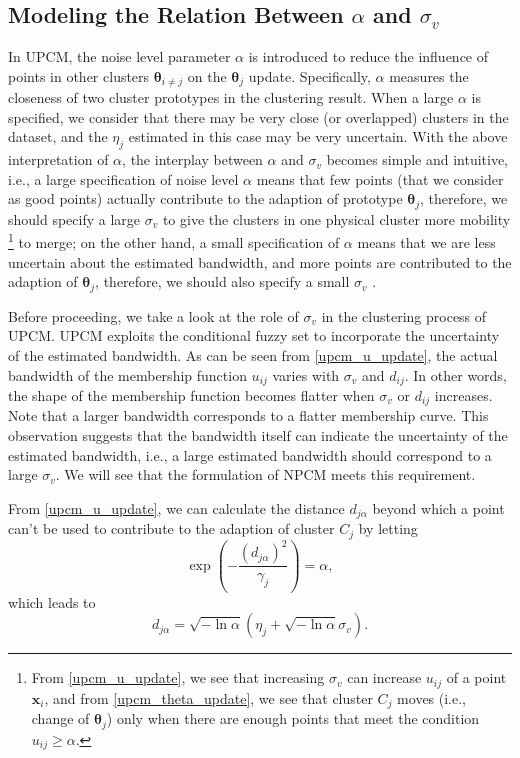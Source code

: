 \documentclass[conference]{IEEEtran}
\theoremstyle{definition}
\begin{document}
\subsection{Modeling the Relation Between $\alpha$ and $\sigma_v$}
\label{sec-3-3}
In UPCM, the noise level parameter $\alpha$ is introduced to reduce the influence of points in other clusters $\boldsymbol{\theta}_{i\neq j}$ on the $\boldsymbol{\theta}_j$ update. Specifically, $\alpha$ measures the closeness of two cluster prototypes in the clustering result. When a large $\alpha$ is specified, we consider that there may be very close (or overlapped) clusters in the dataset, and the $\eta_j$ estimated in this case may be very uncertain. With the above interpretation of $\alpha$, the interplay between $\alpha$ and $\sigma_v$ becomes simple and intuitive, i.e., a large specification of noise level $\alpha$ means that few points (that we consider as good points) actually contribute to the adaption of prototype $\boldsymbol{\theta}_j$, therefore, we should specify a large $\sigma_v$ to give the clusters in one physical cluster more mobility
\footnote{From \eqref{upcm_u_update}, we see that increasing $\sigma_v$ can increase $u_{ij}$ of a point $\mathbf{x}_i$, and from \eqref{upcm_theta_update}, we see that cluster $C_j$ moves (i.e., change of $\boldsymbol{\theta}_j$) only when there are enough points that meet the condition $u_{ij}\geq \alpha$.}
to merge; on the other hand, a small specification of $\alpha$ means that we are less uncertain about the estimated bandwidth, and more points are contributed to the adaption of $\boldsymbol{\theta}_j$, therefore, we should also specify a small $\sigma_v$ \cite{hou_pcm_2016}.

Before proceeding, we take a look at the role of $\sigma_v$ in the clustering process of UPCM. UPCM exploits the conditional fuzzy set to incorporate the uncertainty of the estimated bandwidth. As can be seen from \eqref{upcm_u_update}, the actual bandwidth of the membership function $u_{ij}$ varies with $\sigma_v$ and $d_{ij}$. In other words, the shape of the membership function becomes flatter when $\sigma_v$ or $d_{ij}$ increases. Note that a larger bandwidth corresponds to a flatter membership curve. This observation suggests that the bandwidth itself can indicate the uncertainty of the estimated bandwidth, i.e., a large estimated bandwidth should correspond to a large $\sigma_v$. We will see that the formulation of NPCM meets this requirement.

From \eqref{upcm_u_update}, we can calculate the distance $d_{j\alpha}$ beyond which a point can't be used to contribute to the adaption of cluster $C_j$ by letting
\begin{equation}
\exp\left(-\frac{(d_{j\alpha})^2}{\gamma_j}\right)=\alpha,
\end{equation}
which leads to
\begin{equation}
\label{npcm_d_alpha}
d_{j\alpha}=\sqrt{-\ln\alpha}\left(\eta_j+\sqrt{-\ln\alpha}\sigma_v\right).
\end{equation}
\end{document}
